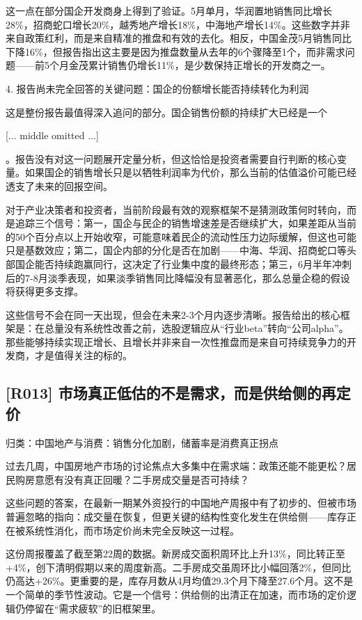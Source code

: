 \documentclass[11pt]{ctexart}
\begin{document}
这一点在部分国企开发商身上得到了验证。5月单月，华润置地销售同比增长28\%，招商蛇口增长20\%，越秀地产增长18\%，中海地产增长14\%。这些数字并非来自政策红利，而是来自精准的推盘和有效的去化。相反，中国金茂5月销售同比下降16\%，但报告指出这主要是因为推盘数量从去年的6个骤降至1个，而非需求问题——前5个月金茂累计销售仍增长11\%，是少数保持正增长的开发商之一。

4. 报告尚未完全回答的关键问题：国企的份额增长能否持续转化为利润

这是整份报告最值得深入追问的部分。国企销售份额的持续扩大已经是一个

[... middle omitted ...]

。报告没有对这一问题展开定量分析，但这恰恰是投资者需要自行判断的核心变量。如果国企的销售增长只是以牺牲利润率为代价，那么当前的估值溢价可能已经透支了未来的回报空间。

对于产业决策者和投资者，当前阶段最有效的观察框架不是猜测政策何时转向，而是追踪三个信号：第一，国企与民企的销售增速差是否继续扩大，如果差距从当前的50个百分点以上开始收窄，可能意味着民企的流动性压力边际缓解，但这也可能只是基数效应；第二，国企内部的分化是否在加剧——中海、华润、招商蛇口等头部国企能否持续跑赢同行，这决定了行业集中度的最终形态；第三，6月半年冲刺后的7-8月淡季表现，如果淡季销售同比降幅没有显著恶化，那么总量企稳的假设将获得更多支撑。

这些信号不会在同一天出现，但会在未来2-3个月内逐步清晰。报告给出的核心框架是：在总量没有系统性改善之前，选股逻辑应从“行业beta”转向“公司alpha”。那些能够持续实现正增长、且增长并非来自一次性推盘而是来自可持续竞争力的开发商，才是值得关注的标的。

\subsection{[R013] 市场真正低估的不是需求，而是供给侧的再定价}
{\small\color{refgray}归类：中国地产与消费：销售分化加剧，储蓄率是消费真正拐点}

过去几周，中国房地产市场的讨论焦点大多集中在需求端：政策还能不能更松？居民购房意愿有没有真正回暖？二手房成交量是否可持续？

这些问题的答案，在最新一期某外资投行的中国地产周报中有了初步的、但被市场普遍忽略的指向：成交量在恢复，但更关键的结构性变化发生在供给侧——库存正在被系统性消化，而市场定价尚未完全反映这一过程。

这份周报覆盖了截至第22周的数据。新房成交面积周环比上升13\%，同比转正至+4\%，创下清明假期以来的周度新高。二手房成交虽周环比小幅回落2\%，但同比仍高达+26\%。更重要的是，库存月数从4月均值29.3个月下降至27.6个月。这不是一个简单的季节性波动。它是一个信号：供给侧的出清正在加速，而市场的定价逻辑仍停留在“需求疲软”的旧框架里。
\end{document}
